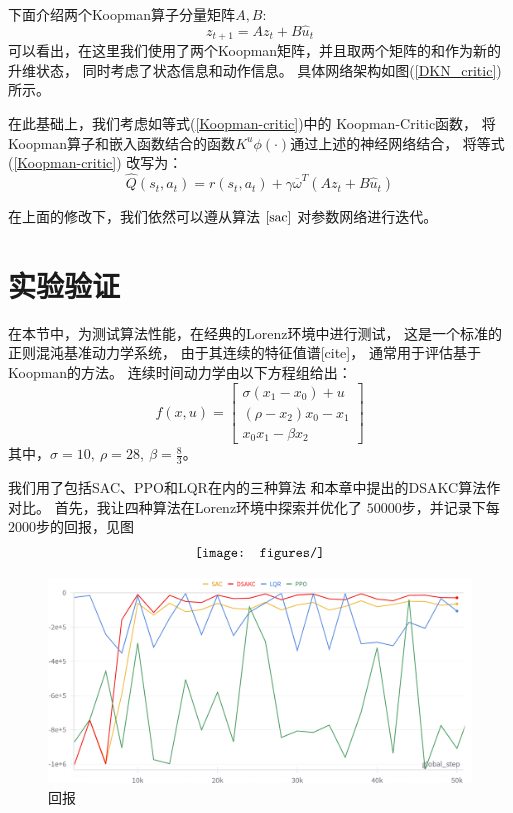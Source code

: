 \documentclass[AutoFakeBold]{LZUThesis}
\begin{document}
下面介绍两个Koopman算子分量矩阵$A, B$:
\begin{equation}
  z_{t + 1} = A z_t + B \hat{u}_t
\end{equation}
可以看出，在这里我们使用了两个Koopman矩阵，并且取两个矩阵的和作为新的升维状态，
同时考虑了状态信息和动作信息。
具体网络架构如图(\ref{DKN_critic})所示。

在此基础上，我们考虑如等式(\ref{Koopman-critic})中的 Koopman-Critic函数，
将Koopman算子和嵌入函数结合的函数$K^u \phi(\cdot)$通过上述的神经网络结合，
将等式 (\ref{Koopman-critic}) 改写为：
\begin{equation}
  \hat{Q}(s_t, a_t) = r(s_t, a_t)
  + \gamma \overline{\omega}^T ( A z_t + B \hat{u}_t )
\end{equation}

在上面的修改下，我们依然可以遵从算法 
$\ref{sac}$ 对参数网络进行迭代。

\section{实验验证}
在本节中，为测试算法性能，在经典的Lorenz环境中进行测试，
这是一个标准的正则混沌基准动力学系统，
由于其连续的特征值谱[cite]，
通常用于评估基于Koopman的方法。
连续时间动力学由以下方程组给出：
\begin{equation}
  f(x, u)=\left[\begin{array}{c}
  \sigma\left(x_{1}-x_{0}\right)+u \\
  \left(\rho-x_{2}\right) x_{0}-x_{1} \\
  x_{0} x_{1}-\beta x_{2}
  \end{array}\right]
\end{equation}
其中，$\sigma = 10,\ \rho = 28,\ \beta = \frac83$。

我们用了包括SAC、PPO和LQR在内的三种算法
和本章中提出的DSAKC算法作对比。
首先，我让四种算法在Lorenz环境中探索并优化了
$50000$步，并记录下每$2000$步的回报，见图
\begin{equation}
  \centering
  \texttt{[image: figures/]}
\end{equation}

\begin{figure}[htbp]
  \centering
  \includegraphics[width=/textwidth]{figures/train_return.png}
  \caption{回报}
\end{figure}
\end{document}
